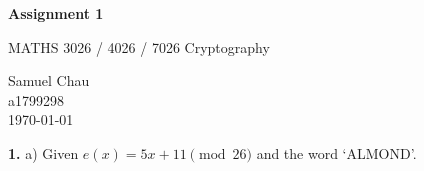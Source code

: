 \documentclass[12pt]{article}
\begin{document}
\begin{titlepage}
    \centering
    \vspace*{5cm}
    
    \Huge
    \textbf{Assignment 1}
    
    \vspace{1cm}
    
    \Large
    MATHS 3026 / 4026 / 7026 Cryptography
    
    \vfill
    
    \large
    Samuel Chau\\
    a1799298\\
    \vspace{0.5cm}
    \today
\end{titlepage}


\noindent\textbf{1.} a) Given $e(x) = 5x + 11 \pmod{26}$ and the word `ALMOND'.

\vspace{0.5cm}
\end{document}
